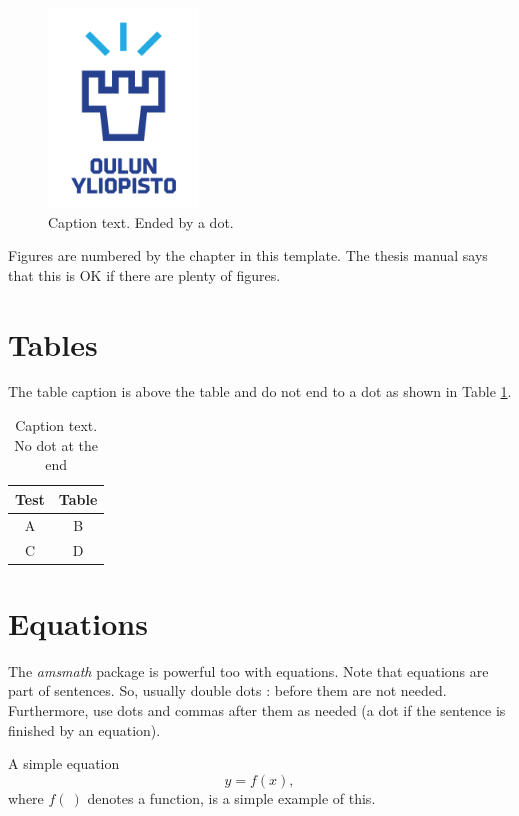 \documentclass[]{dithesis}
\begin{document}
\begin{figure}[tb]
    \centering
    \includegraphics[width=4cm]{UOULUlogoFI.png}
    \caption{Caption text. Ended by a dot.}
    \label{fig:my_label}
\end{figure}

Figures are numbered by the chapter in this template. The thesis manual says that this is OK if there are plenty of figures.

\section{Tables}
The table caption is above the table and do not end to a dot as shown in Table \ref{tab:my_label}.

\begin{table}[b]
\caption{Caption text. No dot at the end}
    \label{tab:my_label}
    \centering
    \begin{tabular}{c|c} \hline
    Test   &  Table \\ \hline\hline
       A  &  B \\ 
       C & D \\ \hline
    \end{tabular}
    
\end{table}

\section{Equations}
The \emph{amsmath} package is powerful too with equations. Note that equations are part of sentences. So, usually double dots : before them are not needed. Furthermore, use dots and commas after them as needed (a dot if the sentence is finished by an equation).

A simple equation
\begin{equation}
    y=f(x),
\end{equation}
where $f(\ )$ denotes a function, is a simple example of this.
\end{document}
